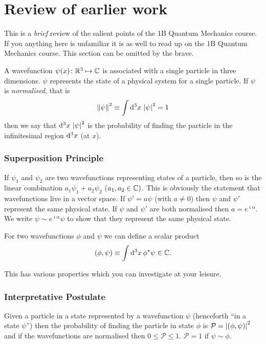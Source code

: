 \documentclass{notes}
\newcommand{\cP}{\mathcal{P}}
\begin{document}
\section{Review of earlier work}

This is a \emph{brief} review of the salient points of the 1B Quantum
Mechanics course.  If you anything here is unfamiliar it is as well to
read up on the 1B Quantum Mechanics course.  This section can be
omitted by the brave.

A wavefunction $\psi(x) \colon \mathbb{R}^3 \mapsto \mathbb{C}$ is associated with a single
particle in three dimensions.  $\psi$ represents the state of a physical
system for a single particle.  If $\psi$ is \emph{normalised}, that is
\[
\left\|\psi\right\|^2 \equiv \int \mathrm{d}^3 x\, \left|\psi\right|^2 = 1
\]
then we say that $\mathrm{d}^3 x\, \left|\psi\right|^2$ is the probability of finding
the particle in the infinitesimal region $\mathrm{d}^3 x$ (at $x$).

\subsubsection*{Superposition Principle}

If $\psi_1$ and $\psi_2$ are two wavefunctions representing states of
a particle, then so is the linear combination
$a_1 \psi_1 + a_2 \psi_2$ ($a_1, a_2 \in \mathbb{C})$.
This is obviously the statement that wavefunctions live in a vector space.
If $\psi' = a \psi$ (with $a \neq 0$) then $\psi$ and $\psi'$ represent the
same physical state.  If $\psi$ and $\psi'$ are both normalised then
$a = e^{\imath \alpha}$.  We write $\psi \sim e^{\imath \alpha} \psi$
to show that they represent the same physical state.

For two wavefunctions $\phi$ and $\psi$ we can define a scalar product
\[
(\phi, \psi) \equiv \int \mathrm{d}^3 x\, \phi^{\ast} \psi \in \mathbb{C}.
\]

This has various properties which you can investigate at your leisure.

\subsubsection*{Interpretative Postulate}

Given a particle in a state represented by a wavefunction $\psi$ (henceforth
``in a state $\psi$'') then the probability of finding the particle in
state $\phi$ is $\cP = \abs{(\phi,\psi)}^2$ and if the wavefunctions are
normalised then $0 \le \cP \le 1$.  $\cP = 1$ if $\psi \sim \phi$.
\end{document}
